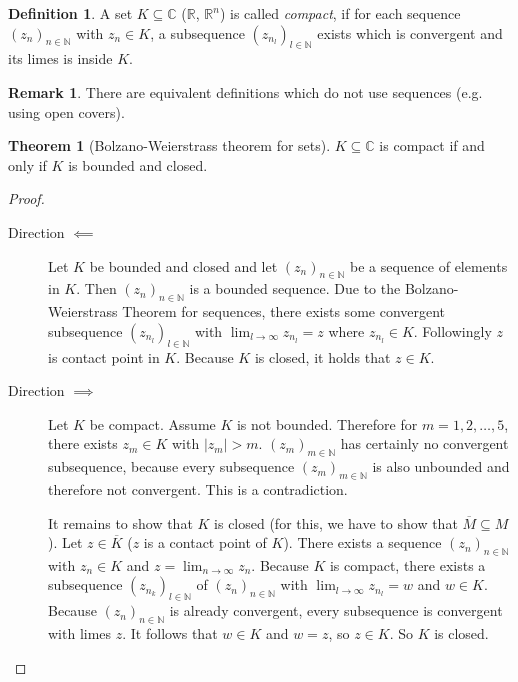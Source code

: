 \documentclass[a4paper,landscape,twocolumn]{article}
\theoremstyle{definition}
\newtheorem{theorem}{Theorem}
\newtheorem{defi}{Definition}
\newtheorem{rem}{Remark}
\newcommand\abs[1]{\left|#1\right|}
\newcommand\seq[1]{{\left(#1\right)}_{n \in \mathbb N}}
\begin{document}
\begin{defi}
  A set $K \subseteq \mathbb C$ ($\mathbb R$, $\mathbb R^n$) is called \emph{compact},
  if for each sequence $\seq{z_n}$ with $z_n \in K$,
  a subsequence $\left(z_{n_l}\right)_{l \in \mathbb N}$
  exists which is convergent and its limes is inside $K$.
\end{defi}
%
\begin{rem}
  There are equivalent definitions which do not use sequences (e.g. using open covers).
\end{rem}
%
\begin{theorem}[Bolzano-Weierstrass theorem for sets]
  $K \subseteq \mathbb C$ is compact if and only if $K$ is bounded and closed.
\end{theorem}
\begin{proof}
  \begin{description}
    \item[Direction $\impliedby$]
      Let $K$ be bounded and closed and let $\seq{z_n}$ be a sequence of elements
      in $K$. Then $\seq{z_n}$ is a bounded sequence. Due to the Bolzano-Weierstrass
      Theorem for sequences, there exists some convergent subsequence
      $\left(z_{n_l}\right)_{l \in \mathbb N}$ with $\lim_{l\to\infty} z_{n_l} = z$
      where $z_{n_l} \in K$. Followingly $z$ is contact point in $K$.
      Because $K$ is closed, it holds that $z \in K$.
    \item[Direction $\implies$]
      Let $K$ be compact. Assume $K$ is not bounded.
      Therefore for $m = 1, 2, \dots, 5$, there exists $z_m \in K$ with $\abs{z_m} > m$.
      $\left(z_m\right)_{m\in\mathbb N}$ has certainly no convergent subsequence, because
      every subsequence $\left(z_m\right)_{m\in\mathbb N}$ is also unbounded and
      therefore not convergent. This is a contradiction.

      It remains to show that $K$ is closed (for this, we have to show that $\overline M \subseteq M$).
      Let $z \in \overline{K}$ ($z$ is a contact point of $K$).
      There exists a sequence $\seq{z_n}$ with $z_n \in K$ and $z = \lim_{n\to\infty} z_n$.
      Because $K$ is compact, there exists a subsequence $\left(z_{n_k}\right)_{l\in\mathbb N}$ of
      $\seq{z_n}$ with $\lim_{l\to\infty} z_{n_l} = w$ and $w \in K$.
      Because $\seq{z_n}$ is already convergent, every subsequence is convergent
      with limes $z$.
      It follows that $w \in K$ and $w = z$, so $z \in K$. So $K$ is closed.
  \end{description}
\end{proof}
\end{document}
